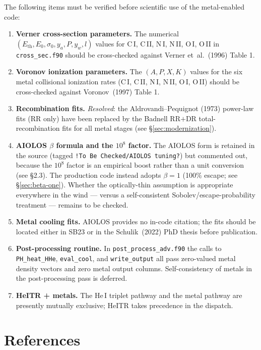 \documentclass[english,a4paper]{kiseon_memo}
\begin{document}
The following items must be verified before scientific use of the
metal-enabled code:
\begin{enumerate}
  \item \textbf{Verner cross-section parameters.}  The numerical
    \((E_\mathrm{th}, E_0, \sigma_0, y_a, P, y_w, l)\) values for
    C\,I, C\,II, N\,I, N\,II, O\,I, O\,II in \texttt{cross\_sec.f90}
    should be cross-checked against Verner et~al.~(1996) Table 1.
  \item \textbf{Voronov ionization parameters.}  The
    \((A, P, X, K)\) values for the six metal collisional ionization
    rates (C\,I, C\,II, N\,I, N\,II, O\,I, O\,II) should be
    cross-checked against Voronov~(1997) Table 1.
  \item \textbf{Recombination fits.}  \emph{Resolved}: the
    Aldrovandi--Pequignot (1973) power-law fits (RR only) have been
    replaced by the Badnell RR$+$DR total-recombination fits for all
    metal stages (see \S\ref{sec:modernization}).
  \item \textbf{AIOLOS $\beta$ formula and the $10^{8}$ factor.}
    The AIOLOS form is retained in the source (tagged
    \texttt{!To Be Checked/AIOLOS tuning?}) but commented out, because
    the \(10^{8}\) factor is an empirical boost rather than a unit
    conversion (see \S2.3).  The production code instead adopts
    \(\beta = 1\) (100\% escape; see \S\ref{sec:beta-one}).  Whether the
    optically-thin assumption is appropriate everywhere in the wind ---
    versus a self-consistent Sobolev/escape-probability treatment ---
    remains to be checked.
  \item \textbf{Metal cooling fits.}  AIOLOS provides no in-code
    citation; the fits should be located either in SB23 or in the
    Schulik~(2022) PhD thesis before publication.
  \item \textbf{Post-processing routine.}  In
    \texttt{post\_process\_adv.f90} the calls to \texttt{PH\_heat\_HHe},
    \texttt{eval\_cool}, and \texttt{write\_output} all pass
    zero-valued metal density vectors and zero metal output columns.
    Self-consistency of metals in the post-processing pass is
    deferred.
  \item \textbf{HeITR + metals.}  The He\,I triplet pathway and the
    metal pathway are presently mutually exclusive; HeITR takes
    precedence in the dispatch.
\end{enumerate}

\section{References}
\end{document}
